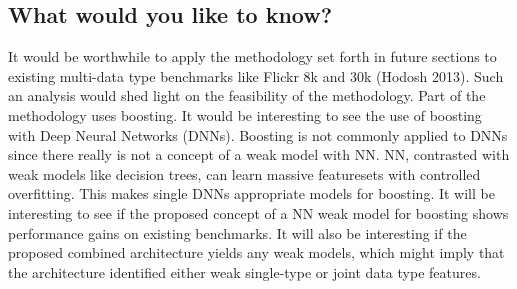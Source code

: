 \subsection{What would you like to know?}

It would be worthwhile to apply the methodology set forth in future sections to existing multi-data type benchmarks like Flickr 8k and 30k (Hodosh 2013).  Such an analysis would shed light on the feasibility of the methodology.  Part of the methodology uses boosting.  It would be interesting to see the use of boosting with Deep Neural Networks (DNNs).  Boosting is not commonly applied to DNNs since there really is not a concept of a weak model with NN.  NN, contrasted with weak models like decision trees, can learn massive featuresets with controlled overfitting.  This makes single DNNs appropriate models for boosting.  It will be interesting to see if the proposed concept of a NN weak model for boosting shows performance gains on existing benchmarks.  It will also be interesting if the proposed combined architecture yields any weak models, which might imply that the architecture identified either weak single-type or joint data type features.



